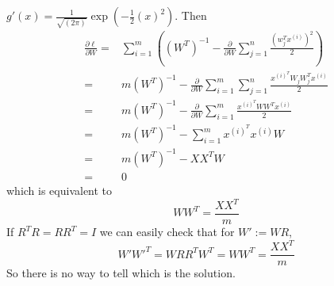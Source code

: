 \begin{answer}
$g'(x) = \frac{1}{\sqrt{(2\pi)^{}}}\exp \left(-\frac{1}{2}(x)^2\right)$. 
Then
\begin{align*}
\frac{\partial \ell}{\partial W} =& \sum_{i=1}^m\left((W^T)^{-1} - \frac{\partial }{\partial W}\sum_{j=1}^n \frac{(w_j^Tx^{(i)})^2}{2}\right)\\
= &m(W^T)^{-1} - \frac{\partial }{\partial W}\sum_{i=1}^m\sum_{j=1}^n \frac{x^{(i)^T}W_jW_j^Tx^{(i)}}{2}\\
= &m(W^T)^{-1} - \frac{\partial }{\partial W}\sum_{i=1}^m \frac{x^{(i)^T}WW^Tx^{(i)}}{2}\\
= &m(W^T)^{-1} - \sum_{i=1}^m x^{(i)^T}x^{(i)}W\\
= &m(W^T)^{-1} - XX^TW\\
= &0
\end{align*}
which is equivalent to \[WW^T = \frac{XX^T}{m} \]
If $ R^TR = RR^T = I $ we can easily check that for $ W':=WR $, 
\[W'W'^T = WRR^TW^T = WW^T = \frac{XX^T}{m} \]
So there is no way to tell which is the solution.
\end{answer}
